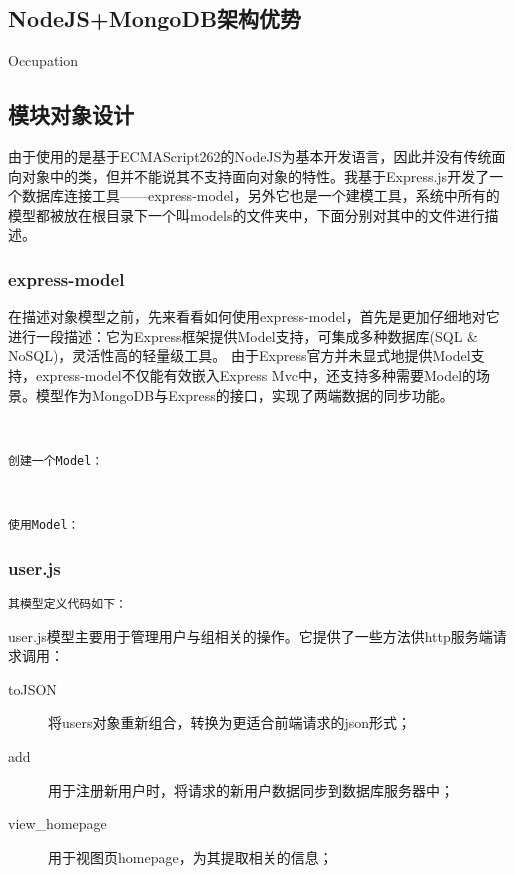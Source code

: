 
\subsection{NodeJS+MongoDB架构优势}
\indent
Occupation

\subsection{模块对象设计}
\indent
由于使用的是基于ECMAScript262的NodeJS为基本开发语言，因此并没有传统面向对象中的类，但并不能说其不支持面向对象的特性。我基于Express.js开发了一个数据库连接工具——express-model，另外它也是一个建模工具，系统中所有的模型都被放在根目录下一个叫models的文件夹中，下面分别对其中的文件进行描述。

\subsubsection{express-model}
在描述对象模型之前，先来看看如何使用express-model，首先是更加仔细地对它进行一段描述：它为Express框架提供Model支持，可集成多种数据库(SQL \& NoSQL)，灵活性高的轻量级工具。 由于Express官方并未显式地提供Model支持，express-model不仅能有效嵌入Express Mvc中，还支持多种需要Model的场景。模型作为MongoDB与Express的接口，实现了两端数据的同步功能。
\par~

\noindent
\texttt{\large 创建一个Model：}

~

\noindent
\texttt{\large 使用Model：}


\subsubsection{user.js}

\noindent
\texttt{\large 其模型定义代码如下：}


\noindent
user.js模型主要用于管理用户与组相关的操作。它提供了一些方法供http服务端请求调用：

\begin{description}
	\item[toJSON] 将users对象重新组合，转换为更适合前端请求的json形式；
	\item[add] 用于注册新用户时，将请求的新用户数据同步到数据库服务器中；
	\item[view\_homepage] 用于视图页homepage，为其提取相关的信息；
\end{description}

